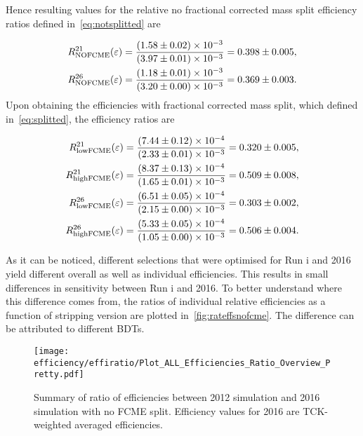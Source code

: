 Hence resulting values for the relative no fractional corrected mass split efficiency ratios defined in~\autoref{eq:notsplitted} are

\begin{equation}
\begin{aligned}
	R^{21}_{\rm{NOFCME}}(\varepsilon)=\frac{(1.58\pm0.02)\times 10 ^{-3 }}{(3.97\pm0.01)\times 10 ^{-3 }}=0.398\pm0.005,\\
	R^{26}_{\rm{NOFCME}}(\varepsilon)=\frac{(1.18\pm0.01)\times 10 ^{-3 }}{(3.20\pm0.00)\times 10 ^{-3 }}=0.369\pm0.003.
\end{aligned}
\label{eq:nofcmeer}
\end{equation}
Upon obtaining the efficiencies with fractional corrected mass split, which defined in~\autoref{eq:splitted}, the efficiency ratios are

\begin{equation}
\begin{aligned}
	R^{21}_{\rm{lowFCME}}(\varepsilon)=\frac{(7.44\pm0.12)\times 10 ^{-4 }}{(2.33\pm0.01)\times 10 ^{-3 }}= 0.320\pm0.005,\\
	R^{21}_{\rm{highFCME}}(\varepsilon)=\frac{(8.37\pm0.13)\times 10 ^{-4 }}{(1.65\pm0.01)\times 10 ^{-3 }}=0.509\pm0.008,\\
	R^{26}_{\rm{lowFCME}}(\varepsilon)=\frac{(6.51\pm0.05)\times 10 ^{-4 }}{(2.15\pm0.00)\times 10 ^{-3 }}=0.303\pm0.002,\\
	R^{26}_{\rm{highFCME}}(\varepsilon)=\frac{(5.33\pm0.05)\times 10 ^{-4 }}{(1.05\pm0.00)\times 10 ^{-3 }}=0.506\pm0.004.
\end{aligned}
\label{eq:allfcmeer}
\end{equation}
	
	
As it can be noticed, different selections that were optimised for Run \Rn{1} and 2016 yield different overall as well as individual efficiencies. This results in small differences in sensitivity between Run \Rn{1} and 2016. To better understand where this difference comes from, the ratios of individual relative efficiencies as a function of stripping version are plotted in~\autoref{fig:rateffsnofcme}. The difference can be attributed to different BDTs.

\begin{figure}[H]
\centering
\texttt{[image: efficiency/effiratio/Plot\_ALL\_Efficiencies\_Ratio\_Overview\_Pretty.pdf]}
\caption{Summary of ratio of efficiencies between 2012 simulation and 2016 simulation with no FCME split. Efficiency values for 2016 are TCK-weighted averaged efficiencies.}
\centering
\label{fig:rateffsnofcme}
\end{figure}

